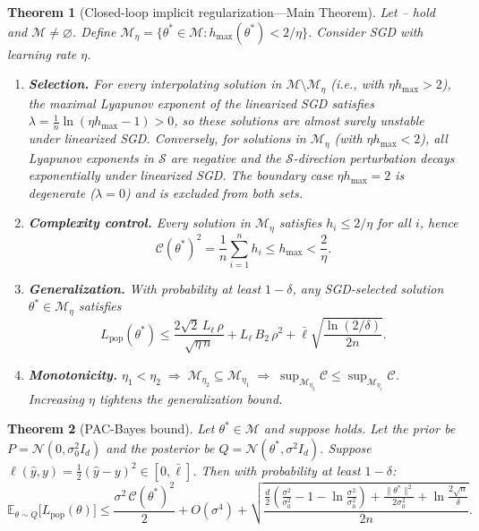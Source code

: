 \documentclass[11pt,a4paper]{article}
\newtheorem{theorem}{Theorem}
\theoremstyle{definition}
\theoremstyle{remark}
\newcommand{\E}{\mathbb{E}}
\newcommand{\cM}{\mathcal{M}}
\newcommand{\cS}{\mathcal{S}}
\newcommand{\cC}{\mathcal{C}}
\begin{document}
\begin{theorem}[Closed-loop implicit regularization---Main Theorem]\label{thm:main}
  Let -- hold and $\cM \neq \varnothing$.
  Define $\cM_\eta = \{\theta^* \in \cM : h_{\max}(\theta^*) < 2/\eta\}$.
  Consider SGD with learning rate $\eta$.
  \begin{enumerate}[label=\textbf{(\Roman*)}]
    \item \textbf{Selection.}\;
      For every interpolating solution in $\cM \setminus \cM_\eta$
      (i.e., with $\eta h_{\max} > 2$),
      the maximal Lyapunov exponent of the \emph{linearized} SGD satisfies
      $\lambda = \frac{1}{n}\ln(\eta h_{\max} - 1) > 0$,
      so these solutions are almost surely unstable under linearized SGD.
      Conversely, for solutions in $\cM_\eta$ (with $\eta h_{\max} < 2$),
      all Lyapunov exponents in $\cS$ are negative and the $\cS$-direction
      perturbation decays exponentially under linearized SGD.
      The boundary case $\eta h_{\max} = 2$ is degenerate
      ($\lambda = 0$) and is excluded from both sets.

    \item \textbf{Complexity control.}\;
      Every solution in $\cM_\eta$ satisfies $h_i \leq 2/\eta$ for all $i$, hence
      \[
        \cC(\theta^*)^2 = \frac{1}{n}\sum_{i=1}^n h_i
        \leq h_{\max} < \frac{2}{\eta}.
      \]

    \item \textbf{Generalization.}\;
      With probability at least $1 - \delta$, any SGD-selected solution
      $\theta^* \in \cM_\eta$ satisfies
      \[
        L_{\mathrm{pop}}(\theta^*)
        \leq \frac{2\sqrt{2}\, L_\ell\,\rho}{\sqrt{\eta\, n}}
        + L_\ell\, B_2\,\rho^2
        + \bar{\ell}\sqrt{\frac{\ln(2/\delta)}{2n}}.
      \]

    \item \textbf{Monotonicity.}\;
      $\eta_1 < \eta_2 \;\Rightarrow\; \cM_{\eta_2} \subseteq \cM_{\eta_1}
      \;\Rightarrow\; \sup_{\cM_{\eta_2}} \cC \leq \sup_{\cM_{\eta_1}} \cC$.
      Increasing $\eta$ tightens the generalization bound.
  \end{enumerate}
\end{theorem}

\begin{theorem}[PAC-Bayes bound]\label{thm:pb}
  Let $\theta^* \in \cM$ and suppose  holds.
  Let the prior be $P = \mathcal{N}(0, \sigma_0^2 I_d)$ and the posterior be
  $Q = \mathcal{N}(\theta^*, \sigma^2 I_d)$.
  Suppose $\ell(\hat{y}, y) = \frac{1}{2}(\hat{y} - y)^2 \in [0, \bar{\ell}]$.
  Then with probability at least $1 - \delta$:
  \begin{equation}\label{eq:pb}
    \E_{\theta \sim Q}\bigl[L_{\mathrm{pop}}(\theta)\bigr]
    \leq \frac{\sigma^2\,\cC(\theta^*)^2}{2} + O(\sigma^4)
    + \sqrt{
      \frac{
        \frac{d}{2}\!\left(\frac{\sigma^2}{\sigma_0^2} - 1
        - \ln\frac{\sigma^2}{\sigma_0^2}\right)
        + \frac{\|\theta^*\|^2}{2\sigma_0^2}
        + \ln\frac{2\sqrt{n}}{\delta}
      }{2n}
    }.
  \end{equation}
\end{theorem}
\end{document}
